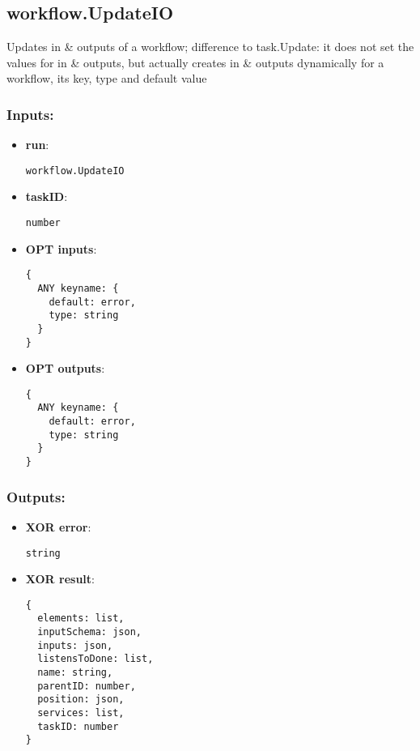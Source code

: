 \subsection{workflow.UpdateIO}
\label{ch:builtinservices:workflow.UpdateIO}
Updates
 in \& outputs of a workflow; difference to task.Update: it does not 
set the values for in \& outputs, but actually creates in \& 
outputs dynamically for a workflow, its key, type and default value
\subsubsection*{Inputs:}
\begin{itemize}
    \item \textbf{run}: 
\begin{lstlisting}
workflow.UpdateIO
\end{lstlisting}
    \item \textbf{taskID}: 
\begin{lstlisting}
number
\end{lstlisting}
    \item \textbf{OPT inputs}: 
\begin{lstlisting}
{
  ANY keyname: {
    default: error, 
    type: string
  }
}
\end{lstlisting}
    \item \textbf{OPT outputs}: 
\begin{lstlisting}
{
  ANY keyname: {
    default: error, 
    type: string
  }
}
\end{lstlisting}
  \end{itemize}

\subsubsection*{Outputs:}
\begin{itemize}
    \item \textbf{XOR error}: 
\begin{lstlisting}
string
\end{lstlisting}
    \item \textbf{XOR result}: 
\begin{lstlisting}
{
  elements: list, 
  inputSchema: json, 
  inputs: json, 
  listensToDone: list, 
  name: string, 
  parentID: number, 
  position: json, 
  services: list, 
  taskID: number
}
\end{lstlisting}
  \end{itemize}

